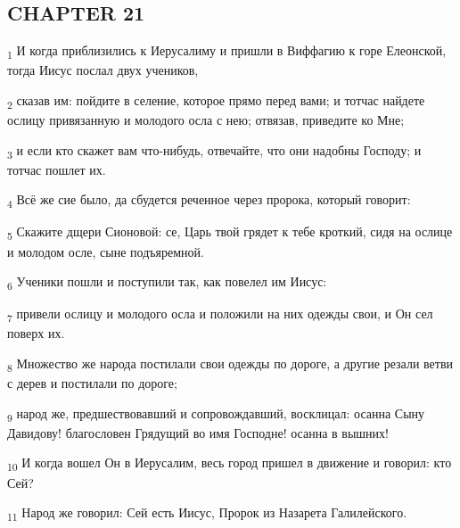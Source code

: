 \subsection{CHAPTER 21}
\begin{tcolorbox}
\textsubscript{1} И когда приблизились к Иерусалиму и пришли в Виффагию к горе Елеонской, тогда Иисус послал двух учеников,
\end{tcolorbox}
\begin{tcolorbox}
\textsubscript{2} сказав им: пойдите в селение, которое прямо перед вами; и тотчас найдете ослицу привязанную и молодого осла с нею; отвязав, приведите ко Мне;
\end{tcolorbox}
\begin{tcolorbox}
\textsubscript{3} и если кто скажет вам что-нибудь, отвечайте, что они надобны Господу; и тотчас пошлет их.
\end{tcolorbox}
\begin{tcolorbox}
\textsubscript{4} Всё же сие было, да сбудется реченное через пророка, который говорит:
\end{tcolorbox}
\begin{tcolorbox}
\textsubscript{5} Скажите дщери Сионовой: се, Царь твой грядет к тебе кроткий, сидя на ослице и молодом осле, сыне подъяремной.
\end{tcolorbox}
\begin{tcolorbox}
\textsubscript{6} Ученики пошли и поступили так, как повелел им Иисус:
\end{tcolorbox}
\begin{tcolorbox}
\textsubscript{7} привели ослицу и молодого осла и положили на них одежды свои, и Он сел поверх их.
\end{tcolorbox}
\begin{tcolorbox}
\textsubscript{8} Множество же народа постилали свои одежды по дороге, а другие резали ветви с дерев и постилали по дороге;
\end{tcolorbox}
\begin{tcolorbox}
\textsubscript{9} народ же, предшествовавший и сопровождавший, восклицал: осанна Сыну Давидову! благословен Грядущий во имя Господне! осанна в вышних!
\end{tcolorbox}
\begin{tcolorbox}
\textsubscript{10} И когда вошел Он в Иерусалим, весь город пришел в движение и говорил: кто Сей?
\end{tcolorbox}
\begin{tcolorbox}
\textsubscript{11} Народ же говорил: Сей есть Иисус, Пророк из Назарета Галилейского.
\end{tcolorbox}
